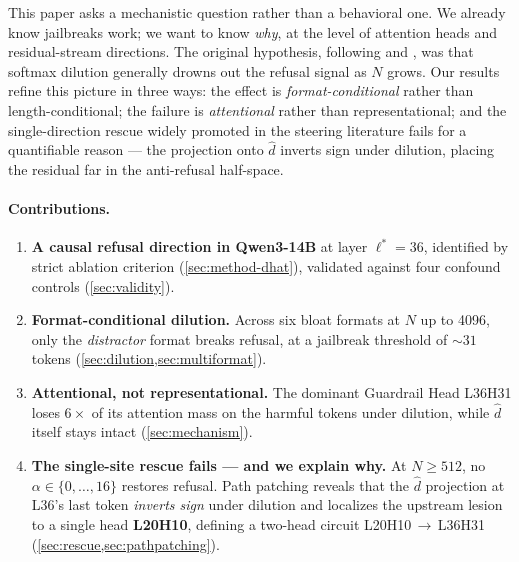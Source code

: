 \documentclass[10pt,twocolumn]{article}
\newcommand{\dhat}{\hat{d}}
\newcommand{\layerL}{\ell}
\newcommand{\Lread}{\layerL^{*}}
\newcommand{\Ncontext}{N}
\newcommand{\model}{Qwen3-14B}
\theoremstyle{definition}
\begin{document}
This paper asks a mechanistic question rather than a behavioral one. We
already know jailbreaks work; we want to know \emph{why}, at the level of
attention heads and residual-stream directions. The original hypothesis,
following \citet{arditi2024refusal} and \citet{anil2024manyshot}, was that
softmax dilution generally drowns out the refusal signal as
$\Ncontext$ grows. Our results refine this picture in three ways: the
effect is \emph{format-conditional} rather than length-conditional;
the failure is \emph{attentional} rather than representational; and the
single-direction rescue widely promoted in the steering literature
\citep{turner2023activation, panickssery2024steering} fails for a
quantifiable reason --- the projection onto $\dhat$ inverts sign under
dilution, placing the residual far in the anti-refusal half-space.

\paragraph{Contributions.}
\begin{enumerate}[leftmargin=*, itemsep=2pt]
  \item \textbf{A causal refusal direction in \model{}} at layer
        $\Lread{=}36$, identified by strict ablation criterion
        (\cref{sec:method-dhat}), validated against four confound
        controls (\cref{sec:validity}).
  \item \textbf{Format-conditional dilution.} Across six bloat formats
        at $\Ncontext$ up to 4096, only the \emph{distractor} format
        breaks refusal, at a jailbreak threshold of ${\sim}31$ tokens
        (\cref{sec:dilution,sec:multiformat}).
  \item \textbf{Attentional, not representational.} The dominant
        Guardrail Head L36H31 loses $6\times$ of its attention mass on
        the harmful tokens under dilution, while $\dhat$ itself stays
        intact (\cref{sec:mechanism}).
  \item \textbf{The single-site rescue fails --- and we explain why.}
        At $\Ncontext{\geq}512$, no $\alpha \in \{0,\ldots,16\}$
        restores refusal. Path patching reveals that the $\dhat$
        projection at L36's last token \emph{inverts sign} under
        dilution and localizes the upstream lesion to a single head
        \textbf{L20H10}, defining a two-head circuit
        L20H10\,$\to$\,L36H31 (\cref{sec:rescue,sec:pathpatching}).
\end{enumerate}

\end{document}
